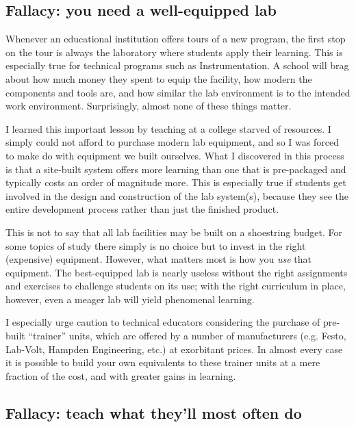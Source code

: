 \subsection{Fallacy: you need a well-equipped lab}

Whenever an educational institution offers tours of a new program, the first stop on the tour is always the laboratory where students apply their learning.  This is especially true for technical programs such as Instrumentation.  A school will brag about how much money they spent to equip the facility, how modern the components and tools are, and how similar the lab environment is to the intended work environment.  Surprisingly, almost none of these things matter.

I learned this important lesson by teaching at a college starved of resources.  I simply could not afford to purchase modern lab equipment, and so I was forced to make do with equipment we built ourselves.  What I discovered in this process is that a site-built system offers more learning than one that is pre-packaged and typically costs an order of magnitude more.  This is especially true if students get involved in the design and construction of the lab system(s), because they see the entire development process rather than just the finished product.

This is not to say that all lab facilities may be built on a shoestring budget.  For some topics of study there simply is no choice but to invest in the right (expensive) equipment.  However, what matters most is how you \textit{use} that equipment.  The best-equipped lab is nearly useless without the right assignments and exercises to challenge students on its use; with the right curriculum in place, however, even a meager lab will yield phenomenal learning.

\vskip 10pt

I especially urge caution to technical educators considering the purchase of pre-built ``trainer'' units, which are offered by a number of manufacturers (e.g. Festo, Lab-Volt, Hampden Engineering, etc.) at exorbitant prices.  In almost every case it is possible to build your own equivalents to these trainer units at a mere fraction of the cost, and with greater gains in learning.







\subsection{Fallacy: teach what they'll most often do}

